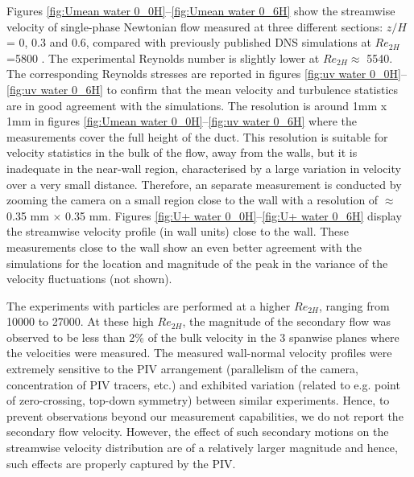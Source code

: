 \documentclass{jfm}
\begin{document}
Figures \ref{fig:Umean water 0_0H}--\ref{fig:Umean water 0_6H} show the streamwise velocity of single-phase Newtonian flow measured at three different sections: $z/H$ = 0, 0.3 and 0.6, compared with previously published DNS simulations  at $Re_{2H}$=5800 \citep{uhlmann2007marginally}. The experimental Reynolds number is slightly lower at $Re_{2H}\approx$ 5540. The corresponding Reynolds stresses are reported in figures \ref{fig:uv water 0_0H}--\ref{fig:uv water 0_6H} to confirm that the mean velocity and turbulence statistics are in good agreement with the simulations. 
%
The resolution is around  1mm x 1mm in figures \ref{fig:Umean water 0_0H}--\ref{fig:uv water 0_6H} where the measurements cover the full height of the duct. This resolution is suitable for velocity statistics in the bulk of the flow, away from the walls, but it is inadequate in the near-wall region, characterised by a large variation in velocity over a very small distance. 
Therefore, an separate measurement is conducted by zooming the camera on a small region close to the wall with a resolution of $\approx$ 0.35 mm $\times$ 0.35 mm. Figures \ref{fig:U+ water 0_0H}--\ref{fig:U+ water 0_6H} display the streamwise velocity profile (in wall units) close to the wall. These measurements close to the wall show an even better agreement with the simulations for the location and magnitude of the peak in the variance of the velocity fluctuations (not shown).

The experiments with particles are performed at a higher $Re_{2H}$, ranging from 10000 to 27000. At these high $Re_{2H}$, the magnitude of the secondary flow was observed to be less than 2\% of the bulk velocity in the 3 spanwise planes where the velocities were measured. The measured wall-normal velocity profiles were extremely sensitive to the PIV arrangement (parallelism of the camera, concentration of PIV tracers, etc.) and  exhibited variation (related to e.g. point of zero-crossing, top-down symmetry) between similar experiments. 
Hence, to prevent observations beyond our measurement capabilities, we do not report the secondary flow velocity. 
However, the effect of such secondary motions on the streamwise velocity distribution are of a relatively larger magnitude and hence, such effects are properly captured by the PIV. 
\end{document}
